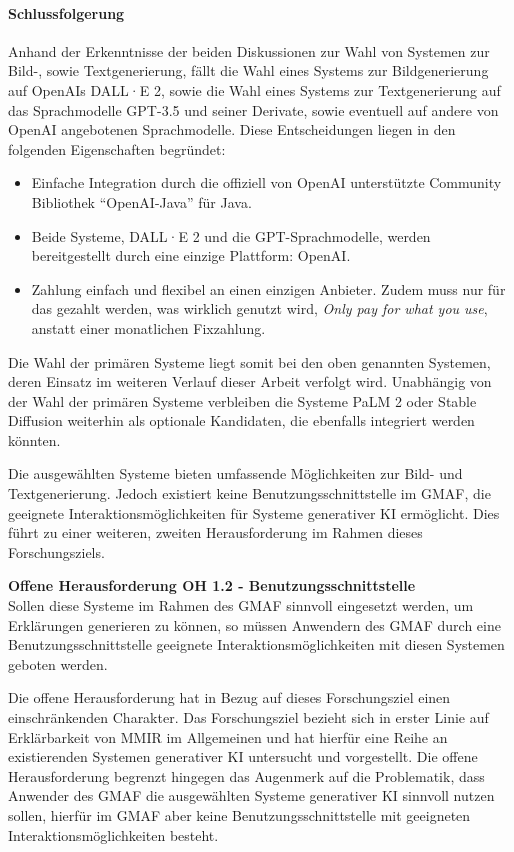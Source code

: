 \paragraph{Schlussfolgerung}
Anhand der Erkenntnisse der beiden Diskussionen zur Wahl von Systemen zur Bild-, sowie Textgenerierung, fällt die Wahl eines Systems zur Bildgenerierung auf OpenAIs DALL·E 2, sowie die Wahl eines Systems zur Textgenerierung auf das Sprachmodelle GPT-3.5 und seiner Derivate, sowie eventuell auf andere von OpenAI angebotenen Sprachmodelle.
Diese Entscheidungen liegen in den folgenden Eigenschaften begründet:
\begin{itemize}
    \item Einfache Integration durch die offiziell von OpenAI unterstützte Community Bibliothek \enquote{OpenAI-Java} \cite{dall-e-java-api} für Java.
    \item Beide Systeme, DALL·E 2 und die GPT-Sprachmodelle, werden bereitgestellt durch eine einzige Plattform: OpenAI.
    \item Zahlung einfach und flexibel an einen einzigen Anbieter.
    Zudem muss nur für das gezahlt werden, was wirklich genutzt wird, \textit{Only pay for what you use}, anstatt einer monatlichen Fixzahlung.
\end{itemize}
Die Wahl der primären Systeme liegt somit bei den oben genannten Systemen, deren Einsatz im weiteren Verlauf dieser Arbeit verfolgt wird.
Unabhängig von der Wahl der primären Systeme verbleiben die Systeme PaLM 2 oder Stable Diffusion weiterhin als optionale Kandidaten, die ebenfalls integriert werden könnten.

Die ausgewählten Systeme bieten umfassende Möglichkeiten zur Bild- und Textgenerierung.
Jedoch existiert keine Benutzungsschnittstelle im GMAF, die geeignete Interaktionsmöglichkeiten für Systeme generativer KI ermöglicht.
Dies führt zu einer weiteren, zweiten Herausforderung im Rahmen dieses Forschungsziels.

\begin{tcolorbox}[minipage, breakable, colback=white, arc=0pt, outer arc=0pt]
    \textbf{Offene Herausforderung OH 1.2 - Benutzungsschnittstelle} \\
    Sollen diese Systeme im Rahmen des GMAF sinnvoll eingesetzt werden, um Erklärungen generieren zu können, so müssen Anwendern des GMAF durch eine Benutzungsschnittstelle geeignete Interaktionsmöglichkeiten mit diesen Systemen geboten werden.
\end{tcolorbox}

Die offene Herausforderung  hat in Bezug auf dieses Forschungsziel einen einschränkenden Charakter.
Das Forschungsziel bezieht sich in erster Linie auf Erklärbarkeit von MMIR im Allgemeinen und hat hierfür eine Reihe an existierenden Systemen generativer KI untersucht und vorgestellt.
Die offene Herausforderung begrenzt hingegen das Augenmerk auf die Problematik, dass Anwender des GMAF die ausgewählten Systeme generativer KI sinnvoll nutzen sollen, hierfür im GMAF aber keine Benutzungsschnittstelle mit geeigneten Interaktionsmöglichkeiten besteht.

